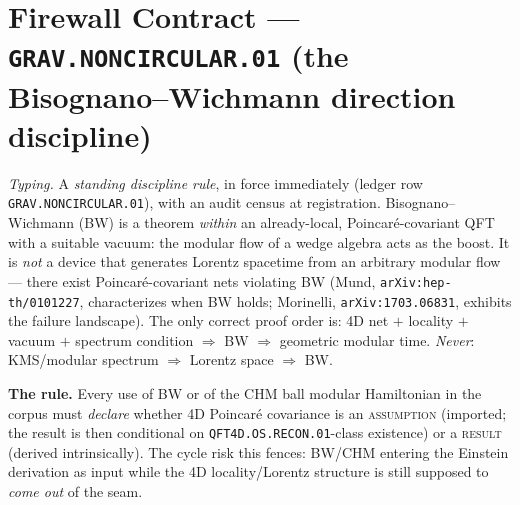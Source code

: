 \section*{Firewall Contract --- \texttt{GRAV.NONCIRCULAR.01} (the Bisognano--Wichmann direction discipline)}
\noindent\emph{Typing.} A \emph{standing discipline rule}, in force immediately (ledger row
\texttt{GRAV.NONCIRCULAR.01}), with an audit census at registration.  Bisognano--Wichmann (BW)
is a theorem \emph{within} an already-local, Poincar\'e-covariant QFT with a suitable vacuum:
the modular flow of a wedge algebra acts as the boost.  It is \emph{not} a device that generates
Lorentz spacetime from an arbitrary modular flow --- there exist Poincar\'e-covariant nets
violating BW (Mund, \texttt{arXiv:hep-th/0101227}, characterizes when BW holds; Morinelli,
\texttt{arXiv:1703.06831}, exhibits the failure landscape).  The only correct proof order is:
4D net $+$ locality $+$ vacuum $+$ spectrum condition $\Rightarrow$ BW $\Rightarrow$ geometric
modular time.  \emph{Never}: KMS/modular spectrum $\Rightarrow$ Lorentz space $\Rightarrow$ BW.

\par\smallskip\noindent\textbf{The rule.}  Every use of BW or of the CHM ball modular
Hamiltonian in the corpus must \emph{declare} whether 4D Poincar\'e covariance is an
\textsc{assumption} (imported; the result is then conditional on
\texttt{QFT4D.OS.RECON.01}-class existence) or a \textsc{result} (derived intrinsically).  The
cycle risk this fences: BW/CHM entering the Einstein derivation as input while the 4D
locality/Lorentz structure is still supposed to \emph{come out} of the seam.

